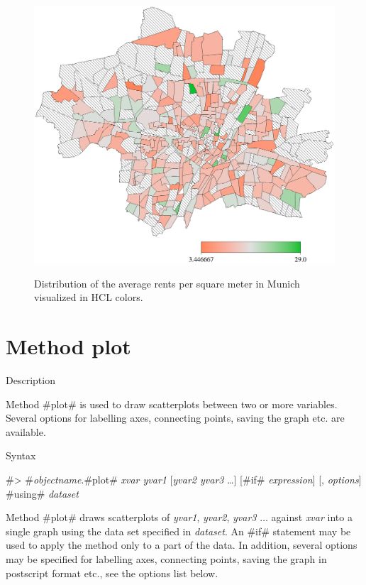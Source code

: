 \begin{figure}[htb]
\begin{center}
\includegraphics[scale=0.5]{grafiken/munichmeansdrawmaphcl.ps}
{\em\caption{ \label{munichmeanshcl} Distribution of the average
rents per square meter in Munich visualized in HCL colors.}}
\end{center}
\end{figure}

\clearpage

\section{Method plot}
\label{graphplot} 
 

\begin{stanza}{Description}

{Method #plot# is used to draw scatterplots between two or more
variables. Several options for labelling axes, connecting points,
saving the graph etc. are available.}
\end{stanza}

\begin{stanza}{Syntax}

{#> #{\em objectname}.#plot#  {\em xvar yvar1} [{\em yvar2 yvar3}
\dots]
[#if# {\em expression}] [, {\em options}] #using# {\em dataset}

Method #plot# draws scatterplots of {\em yvar1}, {\em yvar2}, {\em
yvar3} $\dots$ against {\em xvar} into a single graph using the
data set specified in {\em dataset}. An #if# statement may be used
to apply the method only to a part of the data. In addition,
several options may be specified for labelling axes, connecting
points, saving the graph in postscript format etc., see the
options list below.}
\end{stanza}

